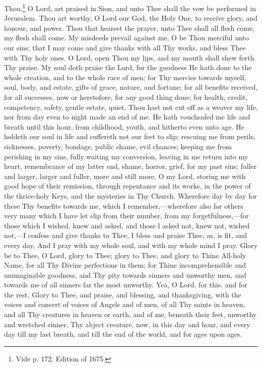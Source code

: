 Thou.\footnote{Vide p. 172, Edition of 1675.} O Lord, art praised in Sion, and unto Thee shall the vow be performed in Jerusalem. Thou art worthy, O Lord our God, the Holy One, to receive glory, and honour, and power. Thou that hearest the prayer, unto Thee shall all flesh come, my flesh shall come. My misdeeds prevail against me, O be Thou merciful unto our sins; that I may come and give thanks with all Thy works, and bless Thee with Thy holy ones. O Lord, open Thou my lips, and my mouth shall shew forth Thy praise. My soul doth praise the Lord, for the goodness He hath done to the whole creation, and to the whole race of men; for Thy mercies towards myself, soul, body, and estate, gifts of grace, nature, and fortune; for all benefits received, for all successes, now or heretofore, for any good thing done; for health, credit, competency, safety, gentle estate, quiet. Thou hast not cut off as a weaver my life, nor from day even to night made an end of me. He hath vouchsafed me life and breath until this hour, from childhood, youth, and hitherto even unto age. He holdeth our soul in life and suffereth not our feet to slip; rescuing me from perils, sicknesses, poverty, bondage, public shame, evil chances; keeping me from perishing in my sins, fully waiting my conversion,  leaving in me return into my heart, remembrance of my latter end, shame, horror, grief, for my past sins; fuller and larger, larger and fuller, more and still more, O my Lord, storing me with good hope of their remission, through repentance and its works, in the power of the thrice‑holy Keys, and the mysteries in Thy Church. Wherefore day by day for these Thy benefits towards me, which I remember,—wherefore also for others very many which I have let slip from their number, from my forgetfulness,—for those which I wished, knew and asked, and those l asked not, knew not, wished not,—I confess and give thanks to Thee, I bless and praise Thee, as, is fit, and every day, And I pray with my whole soul, and with my whole mind I pray.  Glory be to Thee, O Lord, glory to Thee; glory to Thee, and glory to Thine All-holy Name, for all Thy Divine perfections in them; for Thine incomprehensible and unimaginable goodness, and Thy pity towards sinners and unworthy men, and towards me of all sinners far the most unworthy. Yea, O Lord, for this, and for the rest, Glory to Thee, and praise, and blessing, and thanksgiving, with the voices and concert of voices of Angels and of men, of all Thy saints in heaven, and all Thy creatures in heaven or earth, and of me, beneath their feet, unworthy and wretched sinner, Thy abject creature, now, in this day and hour, and every day till my last breath, and till the end of the world, and for ages upon ages.

